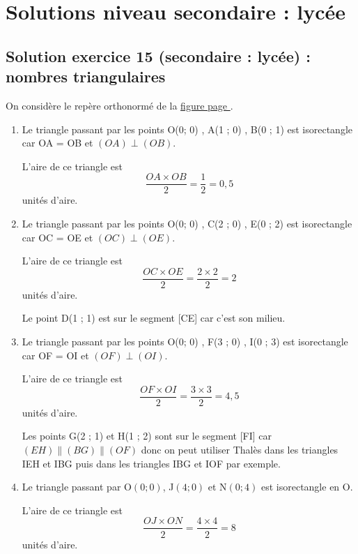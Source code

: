 \section{Solutions niveau secondaire : lycée}

\newpage 

\subsection{Solution exercice 15 (secondaire : lycée) : nombres triangulaires}

\label{sol:niveau15}

On considère le repère orthonormé de la \hyperref[fig:nb-triangulaire]{figure page \pageref{fig:nb-triangulaires}}.

\begin{enumerate}[label=G\arabic*)]
	\item Le triangle passant par les points O(0; 0) , A(1 ; 0) , B(0 ; 1) est isorectangle car OA = OB et $(OA)\perp (OB)$. 
	
	L'aire de ce triangle est \[\dfrac{OA\times OB}{2} = \dfrac{1}{2} = 0,5\] unités d'aire.
	\item Le triangle passant par les points O(0; 0) , C(2 ; 0) , E(0 ; 2) est isorectangle car OC = OE et $(OC)\perp (OE)$. 
	
	L'aire de ce triangle est \[\dfrac{OC\times OE}{2} = \dfrac{2\times 2}{2} = 2\] unités d'aire.
	
	Le point D(1 ; 1) est sur le segment [CE] car c'est son milieu. 
	\item Le triangle passant par les points O(0; 0) , F(3 ; 0) , I(0 ; 3) est isorectangle car OF = OI et $(OF)\perp (OI)$. 
	
	L'aire de ce triangle est \[\dfrac{OF\times OI}{2} = \dfrac{3\times 3}{2} = 4,5\] unités d'aire.
	
	Les points G(2 ; 1) et H(1 ; 2) sont sur le segment [FI] car $(EH)\parallel (BG)\parallel (OF)$ donc on peut utiliser Thalès dans les triangles IEH et IBG puis dans les triangles IBG et IOF par exemple.
	\item Le triangle passant par O$(0 ; 0)$, J$(4 ; 0)$ et N$(0 ; 4)$ est isorectangle en O. 
	
	L'aire de ce triangle est 
	 \[\dfrac{OJ\times ON}{2} = \dfrac{4\times 4}{2} = 8\] unités d'aire.


\end{enumerate}
